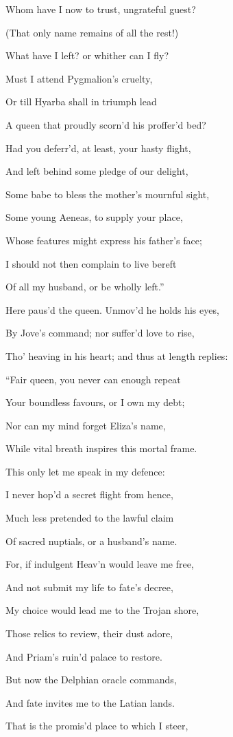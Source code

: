 Whom have I now to trust, ungrateful guest?

(That only name remains of all the rest!)

What have I left? or whither can I fly?

Must I attend Pygmalion’s cruelty,

Or till Hyarba shall in triumph lead

A queen that proudly scorn’d his proffer’d bed?

Had you deferr’d, at least, your hasty flight,

And left behind some pledge of our delight,

Some babe to bless the mother’s mournful sight,

Some young Aeneas, to supply your place,

Whose features might express his father’s face;

I should not then complain to live bereft

Of all my husband, or be wholly left.”

Here paus’d the queen. Unmov’d he holds his eyes,

By Jove’s command; nor suffer’d love to rise,

Tho’ heaving in his heart; and thus at length replies:

“Fair queen, you never can enough repeat

Your boundless favours, or I own my debt;

Nor can my mind forget Eliza’s name,

While vital breath inspires this mortal frame.

This only let me speak in my defence:

I never hop’d a secret flight from hence,

Much less pretended to the lawful claim

Of sacred nuptials, or a husband’s name.

For, if indulgent Heav’n would leave me free,

And not submit my life to fate’s decree,

My choice would lead me to the Trojan shore,

Those relics to review, their dust adore,

And Priam’s ruin’d palace to restore.

But now the Delphian oracle commands,

And fate invites me to the Latian lands.

That is the promis’d place to which I steer,

